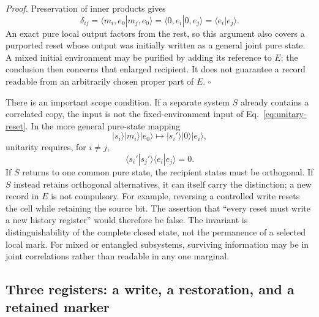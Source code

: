 \noindent\emph{Proof.}
Preservation of inner products gives
\begin{equation}
 \delta_{ij}
 =\langle m_i,e_0|m_j,e_0\rangle
 =\langle 0,e_i|0,e_j\rangle
 =\langle e_i|e_j\rangle.
\end{equation}
An exact pure local output factors from the rest, so this argument also
covers a purported reset whose output was initially written as a general
joint pure state. A mixed initial environment may be purified by adding
its reference to $E$; the conclusion then concerns that enlarged
recipient. It does not guarantee a record readable from an arbitrarily
chosen proper part of $E$. $\square$

There is an important scope condition. If a separate system $S$ already
contains a correlated copy, the input is not the fixed-environment input
of Eq.~\eqref{eq:unitary-reset}. In the more general pure-state mapping
\begin{equation}
 |s_i\rangle|m_i\rangle|e_0\rangle
 \longmapsto |s_i'\rangle|0\rangle|e_i\rangle,
\end{equation}
unitarity requires, for $i\ne j$,
\begin{equation}
 \langle s_i'|s_j'\rangle\langle e_i|e_j\rangle=0.
 \label{eq:reset-factor}
\end{equation}
If $S$ returns to one common pure state, the recipient states must be
orthogonal. If $S$ instead retains orthogonal alternatives, it can itself
carry the distinction; a new record in $E$ is not compulsory. For example,
reversing a controlled write resets the cell while retaining the source
bit. The assertion that ``every reset must write a new history register''
would therefore be false. The invariant is distinguishability of the
complete closed state, not the permanence of a selected local mark.
For mixed or entangled subsystems, surviving information may be in joint
correlations rather than readable in any one marginal.

\subsection{Three registers: a write, a restoration, and a retained marker}
\label{subsec:three-register-write}

